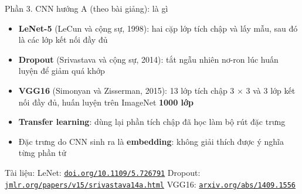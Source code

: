 \documentclass[aspectratio=169,10pt]{beamer}
\begin{document}
\begin{frame}{Phần 3. CNN hướng A (theo bài giảng): là gì}
\begin{itemize}
\item \textbf{LeNet-5} (LeCun và cộng sự, 1998): hai cặp lớp tích chập và lấy mẫu, sau đó là các lớp kết nối đầy đủ
\item \textbf{Dropout} (Srivastava và cộng sự, 2014): tắt ngẫu nhiên nơ-ron lúc huấn luyện để giảm quá khớp
\item \textbf{VGG16} (Simonyan và Zisserman, 2015): 13 lớp tích chập 3 $\times$ 3 và 3 lớp kết nối đầy đủ, huấn luyện trên ImageNet \textbf{1000 lớp}
\item \textbf{Transfer learning}: dùng lại phần tích chập đã học làm bộ rút đặc trưng
\item Đặc trưng do CNN sinh ra là \textbf{embedding}: không giải thích được ý nghĩa từng phần tử
\end{itemize}
\vfill{\scriptsize\color{uitgray}Tài liệu: LeNet: \href{https://doi.org/10.1109/5.726791}{\texttt{doi.org/10.1109/5.726791}} \textbar{} Dropout: \href{https://jmlr.org/papers/v15/srivastava14a.html}{\texttt{jmlr.org/papers/v15/srivastava14a.html}} \textbar{} VGG16: \href{https://arxiv.org/abs/1409.1556}{\texttt{arxiv.org/abs/1409.1556}}}
\end{frame}
\end{document}
